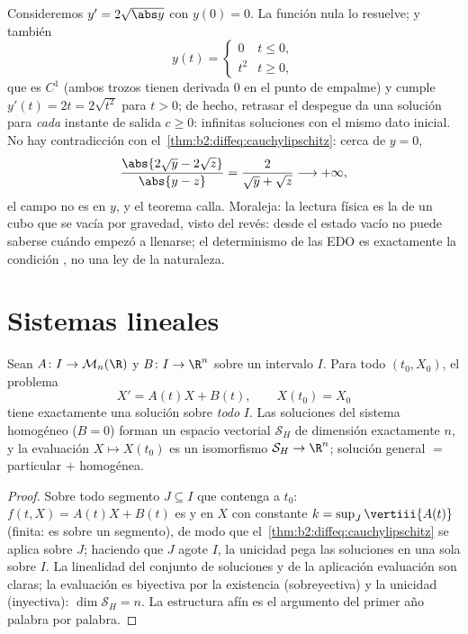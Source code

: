 \begin{example}\label{ex:b2:diffeq:leaky}
Consideremos $y' = 2\sqrt{\abs y}$ con $y(0) = 0$. La función nula lo
resuelve; y también
\[
y(t) = \begin{cases} 0 & t \leq 0,\\ t^2 & t \geq 0,
\end{cases}
\]
que es $C^1$ (ambos trozos tienen derivada $0$ en el punto de
empalme) y cumple $y'(t) = 2t = 2\sqrt{t^2}$ para $t > 0$; de hecho,
retrasar el despegue da una solución para \emph{cada} instante de
salida $c \geq 0$: infinitas soluciones con el mismo dato inicial. No
hay contradicción con el~\cref{thm:b2:diffeq:cauchylipschitz}: cerca
de $y = 0$,
\[
\frac{\abs{2\sqrt y - 2\sqrt z}}{\abs{y - z}}
= \frac{2}{\sqrt y + \sqrt z} \longrightarrow +\infty ,
\]
el campo no es  en $y$, y el teorema calla. Moraleja: la
lectura física es la de un cubo que se vacía por gravedad, visto del
revés: desde el estado vacío no puede saberse cuándo empezó a
llenarse; el determinismo de las EDO es exactamente la condición
, no una ley de la naturaleza.
\end{example}

\section{Sistemas lineales}

\begin{theorem}\label{thm:b2:diffeq:linear}
Sean $A \colon I \to \mathcal{M}_n(\R)$ y $B \colon I \to \R^n$
 sobre un intervalo $I$. Para todo $(t_0, X_0)$, el problema
\[
X' = A(t)X + B(t), \qquad X(t_0) = X_0
\]
tiene exactamente una solución sobre \emph{todo} $I$. Las soluciones
del sistema homogéneo ($B = 0$) forman un espacio vectorial
$\mathcal{S}_H$ de dimensión exactamente $n$, y la evaluación $X
\mapsto X(t_0)$ es un isomorfismo $\mathcal{S}_H \to \R^n$; solución
general $=$ particular $+$ homogénea.
\end{theorem}

\begin{proof}
Sobre todo segmento $J \subseteq I$ que contenga a $t_0$: $f(t, X) =
A(t)X + B(t)$ es  y  en $X$ con constante $k =
\sup_J \vertiii{A(t)}$ (finita: es  sobre un segmento), de
modo que el~\cref{thm:b2:diffeq:cauchylipschitz} se aplica sobre $J$;
haciendo que $J$ agote $I$, la unicidad pega las soluciones en una
sola sobre $I$. La linealidad del conjunto de soluciones y de la
aplicación evaluación son claras; la evaluación es biyectiva por la
existencia (sobreyectiva) y la unicidad (inyectiva): $\dim
\mathcal{S}_H = n$. La estructura afín es el argumento del primer año
palabra por palabra.
\end{proof}

